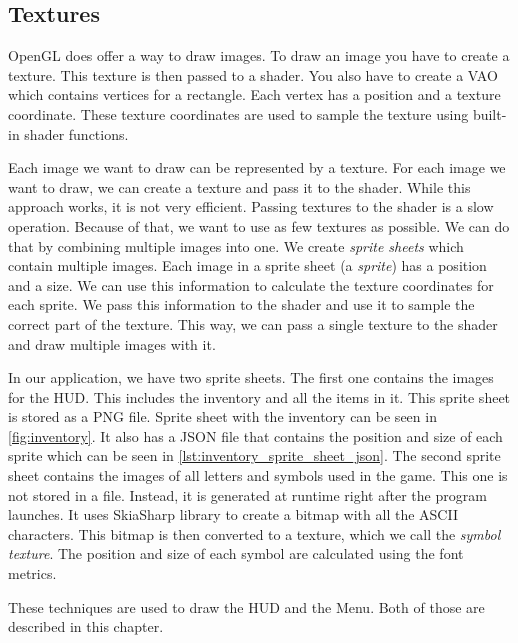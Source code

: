 \subsection{Textures} \label{sec:textures}
OpenGL does offer a way to draw images.
To draw an image you have to create a texture.
This texture is then passed to a shader.
You also have to create a VAO which contains vertices for a rectangle.
Each vertex has a position and a texture coordinate.
These texture coordinates are used to sample the texture using built-in shader functions.

Each image we want to draw can be represented by a texture.
For each image we want to draw, we can create a texture and pass it to the shader.
While this approach works, it is not very efficient.
Passing textures to the shader is a slow operation.
Because of that, we want to use as few textures as possible.
We can do that by combining multiple images into one.
We create \textit{sprite sheets} which contain multiple images.
Each image in a sprite sheet (a \textit{sprite}) has a position and a size.
We can use this information to calculate the texture coordinates for each sprite.
We pass this information to the shader and use it to sample the correct part of the texture.
This way, we can pass a single texture to the shader and draw multiple images with it.

In our application, we have two sprite sheets.
The first one contains the images for the HUD.
This includes the inventory and all the items in it.
This sprite sheet is stored as a PNG file.
Sprite sheet with the inventory can be seen in \autoref{fig:inventory}.
It also has a JSON file that contains the position and size of each sprite which can be seen in \autoref{lst:inventory_sprite_sheet_json}.
The second sprite sheet contains the images of all letters and symbols used in the game.
This one is not stored in a file.
Instead, it is generated at runtime right after the program launches.
It uses SkiaSharp library to create a bitmap with all the ASCII characters.
This bitmap is then converted to a texture, which we call the \textit{symbol texture}.
The position and size of each symbol are calculated using the font metrics.

These techniques are used to draw the HUD and the Menu.
Both of those are described in this chapter.

